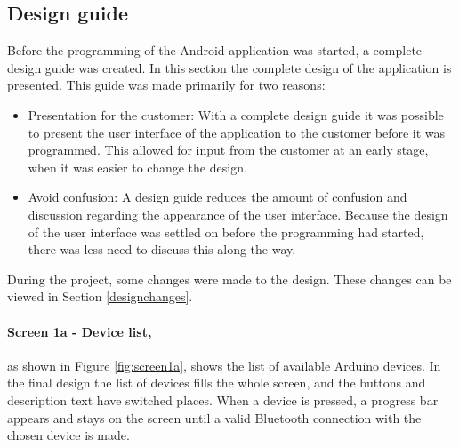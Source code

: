 \subsection{Design guide}
Before the programming of the Android application was started, a complete design guide was created. In this section the complete design of the application is presented. This guide was made primarily for two reasons:\\
\begin{itemize}
	\item{Presentation for the customer:} With a complete design guide it was possible to present the user interface of the application to the customer before it was programmed. This allowed for input from the customer at an early stage, when it was easier to change the design.
	\item{Avoid confusion:} A design guide reduces the amount of confusion and discussion regarding the appearance of the user interface. Because the design of the user interface was settled on before the programming had started, there was less need to discuss this along the way.
\end{itemize}
\vspace{6 mm}
During the project, some changes were made to the design. These changes can be viewed in Section \ref{designchanges}.

\paragraph{Screen 1a - Device list,} as shown in Figure \ref{fig:screen1a}, shows the list of available Arduino devices. In the final design the list of devices fills the whole screen, and the buttons and description text have switched places. When a device is pressed, a progress bar appears and stays on the screen until a valid Bluetooth connection with the chosen device is made.

